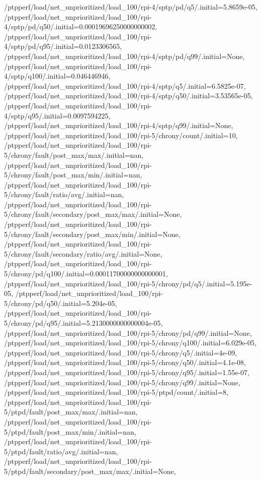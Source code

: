 {    /ptpperf/load/net_unprioritized/load_100/rpi-4/sptp/pd/q5/.initial=5.8659e-05,
    /ptpperf/load/net_unprioritized/load_100/rpi-4/sptp/pd/q50/.initial=0.00019696250000000002,
    /ptpperf/load/net_unprioritized/load_100/rpi-4/sptp/pd/q95/.initial=0.0123306565,
    /ptpperf/load/net_unprioritized/load_100/rpi-4/sptp/pd/q99/.initial=None,
    /ptpperf/load/net_unprioritized/load_100/rpi-4/sptp/q100/.initial=0.046446946,
    /ptpperf/load/net_unprioritized/load_100/rpi-4/sptp/q5/.initial=6.5825e-07,
    /ptpperf/load/net_unprioritized/load_100/rpi-4/sptp/q50/.initial=3.53565e-05,
    /ptpperf/load/net_unprioritized/load_100/rpi-4/sptp/q95/.initial=0.0097594225,
    /ptpperf/load/net_unprioritized/load_100/rpi-4/sptp/q99/.initial=None,
    /ptpperf/load/net_unprioritized/load_100/rpi-5/chrony/count/.initial=10,
    /ptpperf/load/net_unprioritized/load_100/rpi-5/chrony/fault/post_max/max/.initial=nan,
    /ptpperf/load/net_unprioritized/load_100/rpi-5/chrony/fault/post_max/min/.initial=nan,
    /ptpperf/load/net_unprioritized/load_100/rpi-5/chrony/fault/ratio/avg/.initial=nan,
    /ptpperf/load/net_unprioritized/load_100/rpi-5/chrony/fault/secondary/post_max/max/.initial=None,
    /ptpperf/load/net_unprioritized/load_100/rpi-5/chrony/fault/secondary/post_max/min/.initial=None,
    /ptpperf/load/net_unprioritized/load_100/rpi-5/chrony/fault/secondary/ratio/avg/.initial=None,
    /ptpperf/load/net_unprioritized/load_100/rpi-5/chrony/pd/q100/.initial=0.00011700000000000001,
    /ptpperf/load/net_unprioritized/load_100/rpi-5/chrony/pd/q5/.initial=5.195e-05,
    /ptpperf/load/net_unprioritized/load_100/rpi-5/chrony/pd/q50/.initial=5.204e-05,
    /ptpperf/load/net_unprioritized/load_100/rpi-5/chrony/pd/q95/.initial=5.2130000000000004e-05,
    /ptpperf/load/net_unprioritized/load_100/rpi-5/chrony/pd/q99/.initial=None,
    /ptpperf/load/net_unprioritized/load_100/rpi-5/chrony/q100/.initial=6.029e-05,
    /ptpperf/load/net_unprioritized/load_100/rpi-5/chrony/q5/.initial=4e-09,
    /ptpperf/load/net_unprioritized/load_100/rpi-5/chrony/q50/.initial=4.1e-08,
    /ptpperf/load/net_unprioritized/load_100/rpi-5/chrony/q95/.initial=1.55e-07,
    /ptpperf/load/net_unprioritized/load_100/rpi-5/chrony/q99/.initial=None,
    /ptpperf/load/net_unprioritized/load_100/rpi-5/ptpd/count/.initial=8,
    /ptpperf/load/net_unprioritized/load_100/rpi-5/ptpd/fault/post_max/max/.initial=nan,
    /ptpperf/load/net_unprioritized/load_100/rpi-5/ptpd/fault/post_max/min/.initial=nan,
    /ptpperf/load/net_unprioritized/load_100/rpi-5/ptpd/fault/ratio/avg/.initial=nan,
    /ptpperf/load/net_unprioritized/load_100/rpi-5/ptpd/fault/secondary/post_max/max/.initial=None,
}
